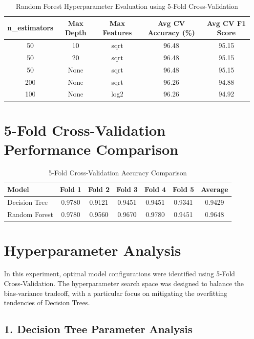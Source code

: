\documentclass[11pt]{article}
\begin{document}
\begin{table}[H]
\centering
\caption{Random Forest Hyperparameter Evaluation using 5-Fold Cross-Validation}
\renewcommand{\arraystretch}{1.3}
\begin{tabular}{ccccc}
\toprule
n\_estimators & Max Depth & Max Features & Avg CV Accuracy (\%) & Avg CV F1 Score \\
\midrule
50 & 10 & sqrt & 96.48 & 95.15 \\
50 & 20 & sqrt & 96.48 & 95.15 \\
50 & None & sqrt & 96.48 & 95.15 \\
200 & None & sqrt & 96.26 & 94.88 \\
100 & None & log2 & 96.26 & 94.92 \\
\bottomrule
\end{tabular}
\end{table}


\section*{5-Fold Cross-Validation Performance Comparison}

\begin{table}[H]
\centering
\caption{5-Fold Cross-Validation Accuracy Comparison}
\renewcommand{\arraystretch}{1.3}
\begin{tabular}{lcccccc}
\toprule
Model & Fold 1 & Fold 2 & Fold 3 & Fold 4 & Fold 5 & Average \\
\midrule
Decision Tree & 0.9780 & 0.9121 & 0.9451 & 0.9451 & 0.9341 & 0.9429 \\
Random Forest & 0.9780 & 0.9560 & 0.9670 & 0.9780 & 0.9451 & 0.9648 \\
\bottomrule
\end{tabular}
\end{table}

\section*{Hyperparameter Analysis}

In this experiment, optimal model configurations were identified using 5-Fold Cross-Validation. The hyperparameter search space was designed to balance the bias-variance tradeoff, with a particular focus on mitigating the overfitting tendencies of Decision Trees.

\subsection*{1. Decision Tree Parameter Analysis}
\end{document}
